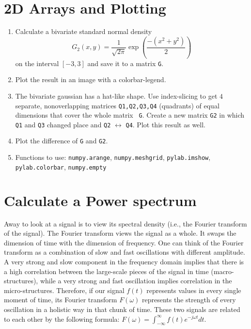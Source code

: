 \documentclass[smallheadings,12pt]{scrartcl}
\begin{document}
\section{2D Arrays and Plotting}
\begin{enumerate}
\item Calculate a bivariate standard normal density
\[
G_2(x,y) = \frac{1}{\sqrt{2\pi}} \exp\left( \frac{-(x^2+y^2)}{2}\right)
\]
on the interval $[-3,3]$ and save it to a matrix {\tt G}.
\item Plot the result in an image with a colorbar-legend.
\item The bivariate gaussian has a hat-like shape. Use index-slicing
  to get $4$ separate, nonoverlapping matrices {\tt Q1,Q2,Q3,Q4}
  (quadrants) of equal dimensions that cover the whole matrix {\tt
    G}. Create a new matrix {\tt G2} in which {\tt Q1} and {\tt Q3}
  changed place and {\tt Q2} $\leftrightarrow$ {\tt Q4}. Plot this
  result as well.
\item Plot the difference of {\tt G} and {\tt G2}.
\item[] Functions to use: {\tt numpy.arange}, {\tt numpy.meshgrid}, 
  {\tt pylab.imshow}, {\tt pylab.colorbar}, {\tt numpy.empty}
\end{enumerate}

\section{Calculate a Power spectrum }
Away to look at a signal is to view its spectral density (i.e., the Fourier transform of the signal). The Fourier transform views the signal as a whole. It swaps the dimension of time with the dimension of frequency. One can think of the Fourier transform as a combination of slow and fast oscillations with different amplitude. A very strong and slow component in the frequency domain implies that there is a high correlation between the large-scale pieces of the signal in time (macro-structures), while a very strong and fast oscillation implies correlation in the micro-structures. Therefore, if our signal $ f(t) $ represents values in every single moment of time, its Fourier transform $F(\omega)$ represents the strength of every oscillation in a holistic way in that chunk of time. These two signals are related to each other by the following formula:
$\displaystyle F(\omega) = \int_{-\infty}^{\infty} f(t){e}^{-j\omega t} dt.$ 
\end{document}
